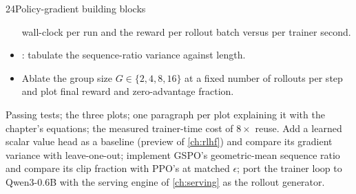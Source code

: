 \begin{labbox}{24}{Policy-gradient building blocks}
\begin{itemize}
  wall-clock per run and the reward per rollout batch versus per trainer second.
\item {}: tabulate the sequence-ratio variance against length.
\item Ablate the group size $G\in\{2,4,8,16\}$ at a fixed number of rollouts per step and plot final
  reward and zero-advantage fraction.
\end{itemize}
Passing tests; the three plots; one paragraph per plot explaining it with the chapter's
equations; the measured trainer-time cost of $8\times$ reuse.
Add a learned scalar value head as a baseline (preview of \cref{ch:rlhf}) and compare its
gradient variance with leave-one-out; implement GSPO's geometric-mean sequence ratio and compare
its clip fraction with PPO's at matched $\epsilon$; port the trainer loop to Qwen3-0.6B with the
serving engine of \cref{ch:serving} as the rollout generator.
\end{labbox}
